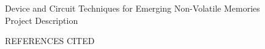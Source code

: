 \documentclass[11pt,letterpaper]{article}
\begin{document}
\vspace*{-0.5\baselineskip} \vspace*{-\baselineskip}

\thispagestyle{empty}

%
\setcounter{page}{1}

\begin{center}
{\Large Device and Circuit Techniques for Emerging Non-Volatile Memories}\\
\vspace*{0.75\baselineskip}
{\Large Project Description}\\

\end{center}




%



\pagebreak

\setcounter{page}{1} \pagebreak
\begin{center}
{\Large  REFERENCES CITED} \\
\end{center}
\setlength{\itemsep}{0pt} \setlength{\parskip}{0pt}


%




%
\end{document}
